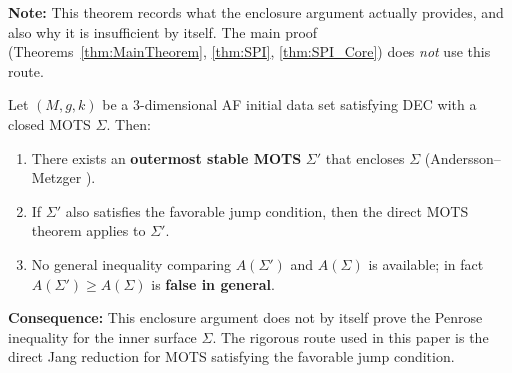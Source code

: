 \begin{theorem}\label{thm:UnstableMOTS}
\textbf{Note:} This theorem records what the enclosure argument actually provides, and also why it is insufficient by itself. The main proof (Theorems~\ref{thm:MainTheorem}, \ref{thm:SPI}, \ref{thm:SPI_Core}) does \emph{not} use this route.

Let $(M, g, k)$ be a 3-dimensional AF initial data set satisfying DEC with a closed MOTS $\Sigma$. Then:
\begin{enumerate}
    \item There exists an \textbf{outermost stable MOTS} $\Sigma'$ that encloses $\Sigma$ (Andersson--Metzger \cite{anderssonmetzger2009}).
    \item If $\Sigma'$ also satisfies the favorable jump condition, then the direct MOTS theorem applies to $\Sigma'$.
    \item No general inequality comparing $A(\Sigma')$ and $A(\Sigma)$ is available; in fact $A(\Sigma') \ge A(\Sigma)$ is \textbf{false in general}.
\end{enumerate}

\textbf{Consequence:} This enclosure argument does not by itself prove the Penrose inequality for the inner surface $\Sigma$. The rigorous route used in this paper is the direct Jang reduction for MOTS satisfying the favorable jump condition.
\end{theorem}

